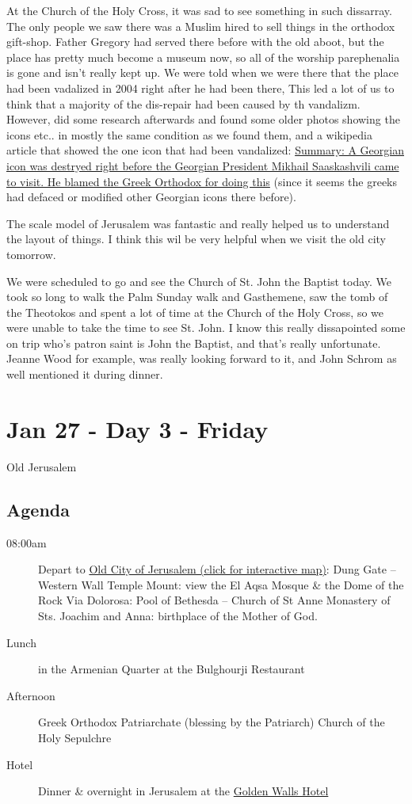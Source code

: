 \documentclass[letterpaper]{report}
\begin{document}
At the Church of the Holy Cross,
it was sad to see something in such dissarray.
The only people we saw there was a Muslim hired to sell things in the orthodox gift-shop. Father Gregory had served there before with the old aboot,
but the place has pretty much become a museum now,
so all of the worship parephenalia is gone and isn't really kept up.
We were told when we were there that the place had been vadalized in 2004 right after he had been there, This led a lot of us to think that a majority of the dis-repair had been caused by th vandalizm.  However, did some research afterwards and found some older photos showing the icons etc.. in mostly the same condition as we found them,
and a wikipedia article that showed the one icon that had been vandalized:
\href{https://en.m.wikipedia.org/wiki/Monastery_of_the_Cross}{
Summary: A Georgian icon was destryed right before the Georgian President Mikhail Saaskashvili came to visit.
He blamed the Greek Orthodox for doing this}
(since it seems the greeks had defaced or modified other Georgian icons there before).


The scale model of Jerusalem was fantastic
and really helped us to understand the layout of things.
I think this wil be very helpful when we visit the old city tomorrow.

We were scheduled to go and see the
Church of St. John the Baptist today.
We took so long to walk the Palm Sunday walk and Gasthemene, saw the tomb of the Theotokos and spent a lot of time at the Church of the Holy Cross, so
we were unable to take the time to see St. John.
I know this really dissapointed some on trip who's patron saint is John the Baptist, and that's really unfortunate.
Jeanne Wood for example, was really looking forward to it, and John Schrom as well mentioned it during dinner. 

\clearpage
\chapter{Jan 27 - Day 3 - Friday}
Old Jerusalem
\section{Agenda}
\begin{description}
	\item[08:00am] Depart to  \href{http://jerusalem.com/map#!/explore/view}{
			Old City of Jerusalem (click for interactive map)}:
		\subitem Dung Gate – Western Wall
		\subitem Temple Mount:
		    view the El Aqsa Mosque \& the Dome of the Rock 
		\subitem Via Dolorosa:
		    Pool of Bethesda -- Church of St Anne
		\subitem Monastery of Sts. Joachim and Anna:
		    birthplace of the Mother of God.
	\item[Lunch] in the Armenian Quarter at the Bulghourji Restaurant 
	\item[Afternoon] Greek Orthodox Patriarchate (blessing by the Patriarch) 
		\subitem Church of the Holy Sepulchre
	\item[Hotel] Dinner \& overnight in Jerusalem at the
	  \href{http://goldenwalls.com/}{Golden Walls Hotel}
\end{description}
\end{document}
